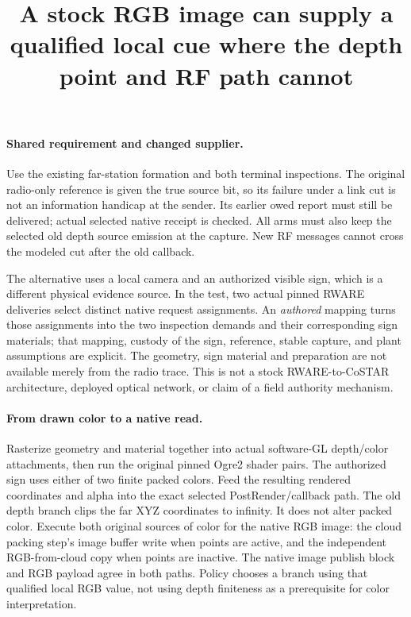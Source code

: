 \documentclass{article}
\begin{document}
\title{A stock RGB image can supply a qualified local cue where the depth point and RF path cannot}
\maketitle

\paragraph{Shared requirement and changed supplier.}
Use the existing far-station formation and both terminal inspections.
The original radio-only reference is given the true source bit, so its
failure under a link cut is not an information handicap at the sender.
Its earlier owed report must still be delivered; actual selected
native receipt is checked. All arms must also keep the selected old
depth source emission at the capture. New RF messages cannot cross
the modeled cut after the old callback.

The alternative uses a local camera and an authorized visible sign,
which is a different physical evidence source. In the test, two actual
pinned RWARE deliveries select distinct native request assignments.
An \emph{authored} mapping turns those assignments into the two
inspection demands and their corresponding sign materials; that
mapping, custody of the sign, reference, stable capture, and plant
assumptions are explicit. The geometry, sign material and preparation
are not available merely from the radio trace. This is not a stock
RWARE-to-CoSTAR architecture, deployed optical network, or claim of
a field authority mechanism.

\paragraph{From drawn color to a native read.}
Rasterize geometry and material together into actual software-GL
depth/color attachments, then run the original pinned Ogre2 shader
pairs. The authorized sign uses either of two finite packed colors.
Feed the resulting rendered coordinates and alpha into the exact
selected PostRender/callback path. The old depth branch clips the far
XYZ coordinates to infinity. It does not alter packed color.
Execute both original sources of color for the native RGB image:
the cloud packing step's image buffer write when points are active,
and the independent RGB-from-cloud copy when points are inactive.
The native image publish block and RGB payload agree in both paths.
Policy chooses a branch using that qualified local RGB value, not
using depth finiteness as a prerequisite for color interpretation.
\end{document}
